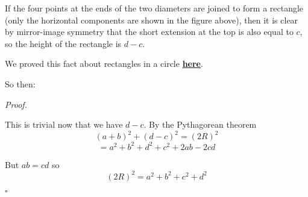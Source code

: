 \documentclass[11pt, oneside]{article}
\begin{document}
If the four points at the ends of the two diameters are joined to form a rectangle (only the horizontal components are shown in the figure above), then it is clear by mirror-image symmetry that the short extension at the top is also equal to $c$, so the height of the rectangle is $d - c$.

We proved this fact about rectangles in a circle \hyperref[sec:rectangle_side_on_a_circle]{\textbf{here}}.  

So then:

\emph{Proof.}

This is trivial now that we have $d - c$.  By the Pythagorean theorem
\[ (a + b)^2 + (d - c)^2 = (2R)^2 \]
\[ = a^2 + b^2 + d^2 + c^2 + 2ab - 2cd \]

But $ab = cd$ so
\[ (2R)^2 = a^2 + b^2 + c^2 + d^2 \]

$\square$
\end{document}
